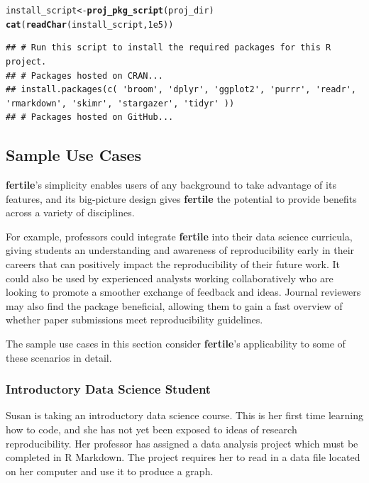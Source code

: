 \documentclass[APA,LATO1COL]{WileyNJD-v2}\usepackage[]{graphicx}\usepackage[]{color}
\makeatletter
\newcommand{\hlnum}[1]{\textcolor[rgb]{0.686,0.059,0.569}{#1}}%
\newcommand{\hlstd}[1]{\textcolor[rgb]{0.345,0.345,0.345}{#1}}%
\newcommand{\hlkwb}[1]{\textcolor[rgb]{0.69,0.353,0.396}{#1}}%
\newcommand{\hlkwd}[1]{\textcolor[rgb]{0.737,0.353,0.396}{\textbf{#1}}}%
\newenvironment{kframe}{%
 \def\at@end@of@kframe{}%
 \ifinner\ifhmode%
  \def\at@end@of@kframe{\end{minipage}}%
  \begin{minipage}{\columnwidth}%
 \fi\fi%
 \def\FrameCommand##1{\hskip\@totalleftmargin \hskip-\fboxsep
 \colorbox{shadecolor}{##1}\hskip-\fboxsep
     \hskip-\linewidth \hskip-\@totalleftmargin \hskip\columnwidth}%
 \MakeFramed {\advance\hsize-\width
   \@totalleftmargin\z@ \linewidth\hsize
   \@setminipage}}%
 {\par\unskip\endMakeFramed%
 \at@end@of@kframe}
\newenvironment{knitrout}{}{} %
\newcommand{\R}{\textsf{R}\xspace}
\newcommand{\pkg}[1]{\textbf{#1}}
\makeatother
\begin{document}
\begin{knitrout}
\color{fgcolor}\begin{kframe}
\begin{alltt}
\hlstd{install_script} \hlkwb{<-} \hlkwd{proj_pkg_script}\hlstd{(proj_dir)}
\hlkwd{cat}\hlstd{(}\hlkwd{readChar}\hlstd{(install_script,} \hlnum{1e5}\hlstd{))}
\end{alltt}
\begin{verbatim}
## # Run this script to install the required packages for this R project.
## # Packages hosted on CRAN...
## install.packages(c( 'broom', 'dplyr', 'ggplot2', 'purrr', 'readr', 'rmarkdown', 'skimr', 'stargazer', 'tidyr' ))
## # Packages hosted on GitHub...
\end{verbatim}
\end{kframe}
\end{knitrout}


\subsection{Sample Use Cases}

\pkg{fertile}'s simplicity enables users of any background to take advantage of its features, and its big-picture design gives \pkg{fertile} the potential to provide benefits across a variety of disciplines. 

For example, professors could integrate \pkg{fertile} into their data science curricula, giving students an understanding and awareness of reproducibility early in their careers that can positively impact the reproducibility of their future work. It could also be used by experienced analysts working collaboratively who are looking to promote a smoother exchange of feedback and ideas. Journal reviewers may also find the package beneficial, allowing them to gain a fast overview of whether paper submissions meet reproducibility guidelines.

The sample use cases in this section consider \pkg{fertile}'s applicability to some of these scenarios in detail.

\subsubsection{Introductory Data Science Student}

Susan is taking an introductory data science course. This is her first time learning how to code, and she has not yet been exposed to ideas of research reproducibility. Her professor has assigned a data analysis project which must be completed in \R Markdown. The project requires her to read in a data file located on her computer and use it to produce a graph.
\end{document}
